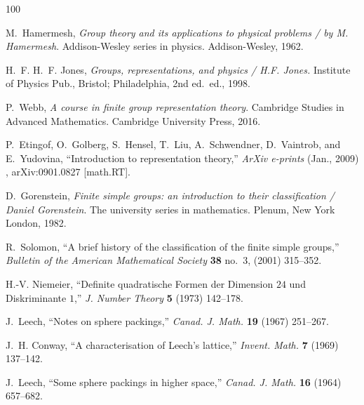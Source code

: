 \documentclass[11pt,a4paper,fontset=windows]{ctexart}
\numberwithin{equation}{section}
\begin{document}
\providecommand{\href}[2]{#2}\begingroup\raggedright\begin{thebibliography}{100}

M.~Hamermesh, {\em Group theory and its applications to physical problems / by
  M. Hamermesh}.
\newblock Addison-Wesley series in physics. Addison-Wesley, 1962.

H.~F. H.~F. Jones, {\em Groups, representations, and physics / H.F. Jones.}
\newblock Institute of Physics Pub., Bristol; Philadelphia, 2nd ed.~ed., 1998.

P.~Webb, \href{http://dx.doi.org/10.1017/CBO9781316677216}{{\em A course in
  finite group representation theory}}.
\newblock Cambridge Studies in Advanced Mathematics. Cambridge University
  Press, 2016.

P.~{Etingof}, O.~{Golberg}, S.~{Hensel}, T.~{Liu}, A.~{Schwendner},
  D.~{Vaintrob}, and E.~{Yudovina}, ``{Introduction to representation
  theory},'' {\em ArXiv e-prints} (Jan., 2009) ,
  \href{http://arxiv.org/abs/0901.0827}{{\ttfamily arXiv:0901.0827 [math.RT]}}.

D.~Gorenstein, {\em Finite simple groups: an introduction to their
  classification / Daniel Gorenstein}.
\newblock The university series in mathematics. Plenum, New York London, 1982.

R.~Solomon, ``A brief history of the classification of the finite simple
  groups,'' {\em Bulletin of the American Mathematical Society} {\bfseries 38}
  no.~3, (2001) 315--352.

H.-V. Niemeier, ``Definite quadratische {F}ormen der {D}imension {$24$} und
  {D}iskriminante {$1$},'' {\em J. Number Theory} {\bfseries 5} (1973)
  142--178.

J.~Leech, ``Notes on sphere packings,'' {\em Canad. J. Math.} {\bfseries 19}
  (1967) 251--267.

J.~H. Conway, ``A characterisation of {L}eech's lattice,'' {\em Invent. Math.}
  {\bfseries 7} (1969) 137--142.

J.~Leech, ``Some sphere packings in higher space,'' {\em Canad. J. Math.}
  {\bfseries 16} (1964) 657--682.


\end{thebibliography}
\end{document}
